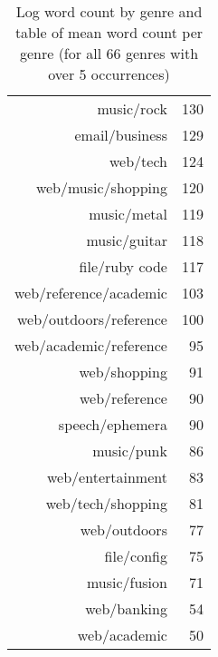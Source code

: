 \begin{table}[ht]
\begin{tabular}{rr}
        music/rock &  130 \\
        email/business &  129 \\ 
        web/tech &  124 \\ 
        web/music/shopping &  120 \\ 
        music/metal &  119 \\ 
        music/guitar &  118 \\ 
        file/ruby code &  117 \\ 
        web/reference/academic &  103 \\ 
        web/outdoors/reference &  100 \\ 
        web/academic/reference &   95 \\ 
        web/shopping &   91 \\ 
        web/reference &   90 \\ 
        speech/ephemera &   90 \\ 
        music/punk &   86 \\ 
        web/entertainment &   83 \\ 
        web/tech/shopping &   81 \\ 
        web/outdoors &   77 \\ 
        file/config &   75 \\ 
        music/fusion &   71 \\ 
        web/banking &   54 \\ 
        web/academic &   50 \\ 
        \hline
    \end{tabular}
    

    \label{fig:presonal:genreworddist}
    \caption{Log word count by genre and table of mean word count per genre (for all 66 genres with over 5 occurrences)}
\end{table}
\FloatBarrier

